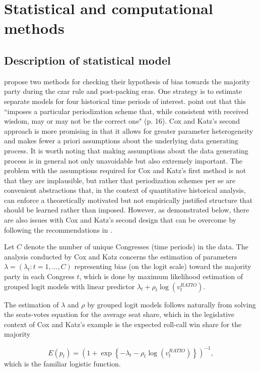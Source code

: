 \section{Statistical and computational methods}
\subsection{Description of statistical model}
\label{subsection_methods}

 propose two methods for checking their hypothesis of bias towards the majority party during the czar rule and post-packing eras. One strategy is to estimate separate models for four historical time periods of interest.  point out that this ``imposes a particular periodization scheme that, while consistent with received wisdom, may or may not be the correct one" (p. 16). Cox and Katz's second approach is more promising in that it allows for greater parameter heterogeneity and makes fewer a priori assumptions about the underlying data generating process. It is worth noting that making assumptions about the data generating process is in general not only unavoidable but also extremely important. The problem with the assumptions required for Cox and Katz's first method is not that they are implausible, but rather that periodization schemes per se are convenient abstractions that, in the context of quantitative historical analysis, can enforce a theoretically motivated but not empirically justified structure that should be learned rather than imposed. However, as demonstrated below, there are also issues with Cox and Katz's second design that can be overcome by following the recommendations in . 

Let $C$ denote the number of unique Congresses (time periods) in the data. The analysis conducted by Cox and Katz concerns the estimation of parameters  $\lambda = (\lambda_t : t = 1, \dots, C)$ representing bias (on the logit scale) toward the majority party in each Congress $t$, which is done by maximum likelihood estimation of grouped logit models with linear predictor $ \lambda_t + \rho_t \log{\left(v_t^{RATIO} \right)}$. 

The estimation of $\lambda$ and $\rho$ by grouped logit models follows naturally from solving the seats-votes equation for the average seat share, which in the legislative context of Cox and Katz's example is the expected roll-call win share for the majority 

\begin{equation*}
  E(p_t)  = \left(1 + \exp{\left\{- \lambda_t - \rho_t \log{\left( v_t^{RATIO}  \right)}\right\}}\right)^{-1},
\end{equation*}
%
\noindent which is the familiar logistic function. 

